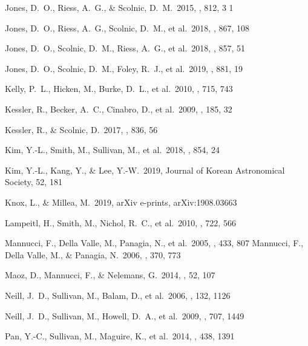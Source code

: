 \documentclass[]{aa} %
\begin{document}
\begin{thebibliography}{}

 Jones, D.~O., Riess, A.~G., \& Scolnic, D.~M.\ 2015, \apj, 812, 3
1

 Jones, D.~O., Riess, A.~G., Scolnic, D.~M., et al.\ 2018, \apj, 867, 108

 Jones, D.~O., Scolnic, D.~M., Riess, A.~G., et al.\ 2018, \apj, 857, 51

 Jones, D.~O., Scolnic, D.~M., Foley, R.~J., et al.\ 2019, \apj, 881, 19

 Kelly, P.~L., Hicken, M., Burke, D.~L., et al.\ 2010, \apj, 715, 743

 Kessler, R., Becker, A.~C., Cinabro, D., et al.\ 2009, \apjs, 185, 32

 Kessler, R., \& Scolnic, D.\ 2017, \apj, 836, 56

 Kim, Y.-L., Smith, M., Sullivan, M., et al.\ 2018, \apj, 854, 24

 Kim, Y.-L., Kang, Y., \& Lee, Y.-W.\ 2019, Journal of Korean Astronomical Society, 52, 181

 Knox, L., \& Millea, M.\ 2019, arXiv e-prints, arXiv:1908.03663

 Lampeitl, H., Smith, M., Nichol, R.~C., et al.\ 2010, \apj, 722, 566

 Mannucci, F.,
  Della Valle, M., Panagia, N., et al.\ 2005, \aap, 433, 807 
 Mannucci, F.,
  Della Valle, M., \& Panagia, N.\ 2006, \mnras, 370, 773 

 Maoz, D., Mannucci,
  F., \& Nelemans, G.\ 2014, \araa, 52, 107 


 Neill, J.~D., Sullivan, M., Balam, D., et al.\ 2006, \aj, 132, 1126

 Neill, J.~D., Sullivan, M., Howell, D.~A., et al.\ 2009, \apj, 707, 1449

 Pan, Y.-C., Sullivan, M., Maguire, K., et al.\ 2014, \mnras, 438, 1391


\end{thebibliography}
\end{document}
